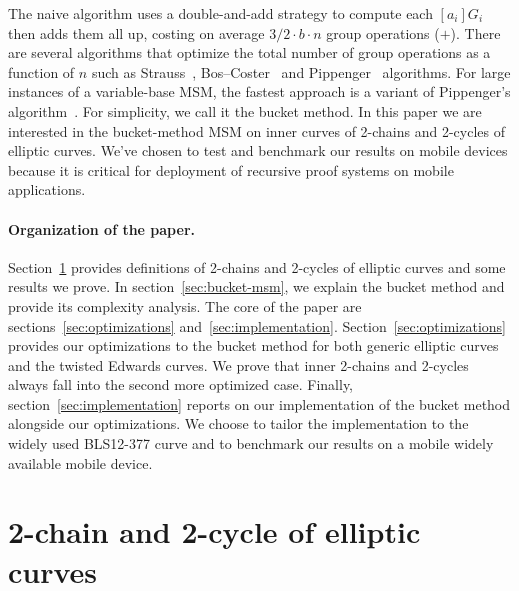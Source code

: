 \documentclass[journal=tches,spthm]{iacrtrans}
\begin{document}
The naive algorithm uses a double-and-add strategy to compute each $[a_i]G_i$
then adds them all up, costing on average $3/2 \cdot b \cdot n$ group
operations ($+$). There are several algorithms that optimize the total number
of group operations as a function of $n$ such as Strauss~\cite{amm:Strauss64},
Bos--Coster~\cite[Sec.~4]{EC:deRooij94} and Pippenger~\cite{focs:Pippenger76}
algorithms. For large instances of a variable-base MSM, the fastest approach is
a variant of Pippenger's algorithm~\cite[Sec.~4]{INDOCRYPT:BDLO12}. For
simplicity, we call it the bucket method. In this paper we are interested
in the bucket-method MSM on inner curves of 2-chains and 2-cycles of elliptic
curves.  We've chosen to test and benchmark our results on mobile devices
because it is critical for deployment of recursive proof systems on mobile
applications.
%
\paragraph{Organization of the paper.}
Section~\ref{sec:2-chain-cycle} provides definitions of 2-chains and 2-cycles
of elliptic curves and some results we prove.  In section~\ref{sec:bucket-msm},
we explain the bucket method and provide its complexity analysis.  The core of
the paper are sections~\ref{sec:optimizations} and~\ref{sec:implementation}.
Section~\ref{sec:optimizations} provides our optimizations to the bucket method
for both generic elliptic curves and the twisted Edwards curves. We prove that
inner 2-chains and 2-cycles always fall into the second more optimized case.
Finally, section~\ref{sec:implementation} reports on our implementation of the
bucket method alongside our optimizations. We choose to tailor the
implementation to the widely used BLS12-377 curve and to benchmark our results
on a mobile widely available mobile device.
%
\section{2-chain and 2-cycle of elliptic curves}
\label{sec:2-chain-cycle}
\end{document}
